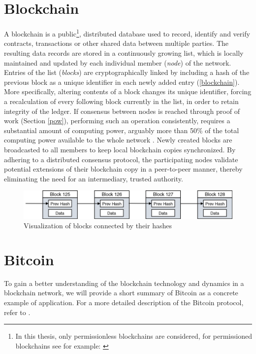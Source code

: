 \documentclass[a4paper,12pt,twoside]{report}
\begin{document}
\section{Blockchain}
A blockchain is a public\footnote{In this thesis, only permissionless blockchains are considered, for permissioned blockchains see for example: \cite{permissioned}}, distributed database used to record, identify and verify contracts, transactions or other shared data between multiple parties. The resulting data records are stored in a continuously growing list, which is locally maintained and updated by each individual member (\textit{node}) of the network. Entries of the list (\textit{blocks}) are cryptographically linked by including a hash of the previous block as a unique identifier in each newly added entry (\autoref{blockchain}). More specifically, altering contents of a block changes its unique identifier, forcing a recalculation of every following block currently in the list, in order to retain integrity of the ledger. If consensus between nodes is reached through proof of work (Section \ref{pow}), performing such an operation consistently, requires a substantial amount of computing power, arguably more than 50\% of the total computing power available to the whole network \cite{nakamoto2008bitcoin}. Newly created blocks are broadcasted to all members to keep local blockchain copies synchronized. By adhering to a distributed consensus protocol, the participating nodes validate potential extensions of their blockchain copy in a peer-to-peer manner, thereby eliminating the need for an intermediary, trusted authority. 

\begin{figure}[ht]
	\centering
  \includegraphics[width=\textwidth]{blockchain.png}
	\caption{Visualization of blocks connected by their hashes}
	\label{blockchain}
\end{figure}
 
\section{Bitcoin} \label{bitcoin}
To gain a better understanding of the blockchain technology and dynamics in a blockchain network, we will provide a short summary of Bitcoin as a concrete example of application. For a more detailed description of the Bitcoin protocol, refer to \cite{nakamoto2008bitcoin,antonopoulos2017mastering,okupski2014bitcoin}.
\end{document}
